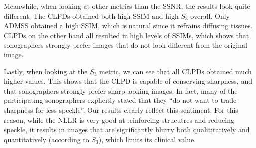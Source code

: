 Meanwhile, when looking at other metrics than the SSNR, the results look quite different.
The CLPDs obtained both high SSIM and high \(S_3\) overall.
Only ADMSS obtained a high SSIM, which is natural since it refrains diffusing tissues.
CLPDs on the other hand all resulted in high levels of SSIMs, which shows that sonographers strongly prefer images that do not look different from the original image.

Lastly, when looking at the \(S_3\) metric, we can see that all CLPDs obtained much higher values.
This shows that the CLPD is capable of conserving sharpness, and that sonographers strongly prefer sharp-looking images.
In fact, many of the participating sonographers explicitly stated that they ``do not want to trade sharpness for less speckle''.
Our results clearly reflect this sentiment.
For this reason, while the NLLR is very good at reinforcing strucutres and reducing speckle, it results in images that are significantly blurry both qualititatively and quantitatively (according to \(S_3\)), which limits its clinical value.

